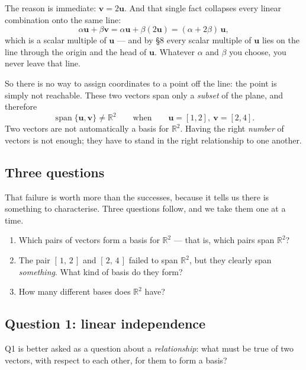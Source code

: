 \documentclass[11pt]{article}
\theoremstyle{definition}
\theoremstyle{remark}
\newcommand{\R}{\mathbb{R}}
\newcommand{\vc}[1]{\mathbf{#1}}
\DeclareMathOperator{\spanop}{span}   %
\begin{document}
\noindent The reason is immediate: $\vc{v}=2\vc{u}$. And that single fact
collapses every linear combination onto the same line:
\[
  \alpha\vc{u} + \beta\vc{v}
  = \alpha\vc{u} + \beta(2\vc{u})
  = (\alpha+2\beta)\,\vc{u} ,
\]
which is a scalar multiple of $\vc{u}$ --- and by \S8 every scalar multiple of
$\vc{u}$ lies on the line through the origin and the head of $\vc{u}$. Whatever
$\alpha$ and $\beta$ you choose, you never leave that line.

So there is no way to assign coordinates to a point off the line: the point is
simply not reachable. These two vectors span only a \emph{subset} of the plane,
and therefore
\[
  \spanop\{\vc{u},\vc{v}\} \neq \R^{2}
  \qquad\text{when}\qquad
  \vc{u}=[1,2],\ \vc{v}=[2,4].
\]
Two vectors are not automatically a basis for $\R^{2}$. Having the right
\emph{number} of vectors is not enough; they have to stand in the right
relationship to one another.

\subsection{Three questions}
That failure is worth more than the successes, because it tells us there is
something to characterise. Three questions follow, and we take them one at a
time.

\begin{enumerate}[label=\textbf{Q\arabic*.},leftmargin=3.0em,itemsep=5pt,
                  topsep=5pt]
  \item Which pairs of vectors form a basis for $\R^{2}$ --- that is, which
        pairs span $\R^{2}$?
  \item The pair $[\,1,\,2\,]$ and $[\,2,\,4\,]$ failed to span $\R^{2}$, but
        they clearly span \emph{something}. What kind of basis do they form?
  \item How many different bases does $\R^{2}$ have?
\end{enumerate}

\subsection{Question 1: linear independence}
Q1 is better asked as a question about a \emph{relationship}: what must be true
of two vectors, with respect to each other, for them to form a basis?
\end{document}
